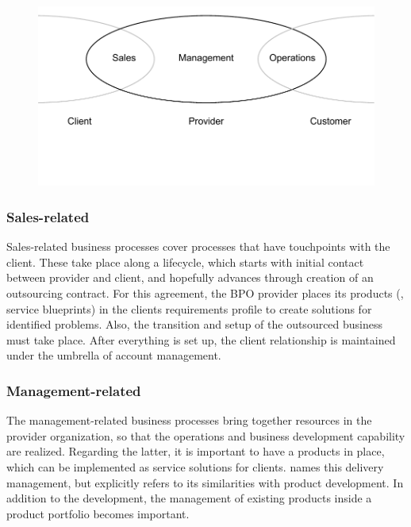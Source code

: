 	
	\begin{figure}[caption={BPO chain provider scope with stakeholders}, label={fig:bpochainscope}]
		{	\includegraphics[width=.8\textwidth]{figures/chain2.pdf}}
	\end{figure} 
	
	\subsubsection{Sales-related}
	Sales-related business processes cover processes that have touchpoints with the client. These take place along a lifecycle, which starts with initial contact between provider and client, and hopefully advances through creation of an outsourcing contract. For this agreement, the \acrshort{BPO} provider places its products (\ie, service blueprints) in the clients requirements profile to create solutions for identified problems. Also, the transition and setup of the outsourced business must take place. After everything is set up, the client relationship is maintained under the umbrella of account management. 
	
	\subsubsection{Management-related}
	The management-related business processes bring together resources in the provider organization, so that the operations and business development capability are realized. Regarding the latter, it is important to have a products in place, which can be implemented as service solutions for clients.  \citep{schewe2007} names this delivery management, but explicitly refers to its similarities with product development. In addition to the development, the management of existing products inside a product portfolio becomes important. 
	
